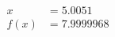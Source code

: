 \documentclass[preview]{standalone}
\begin{document}
\begin{align*}
x &= 5.0051\\f(x) &= 7.9999968
\end{align*}
\end{document}
